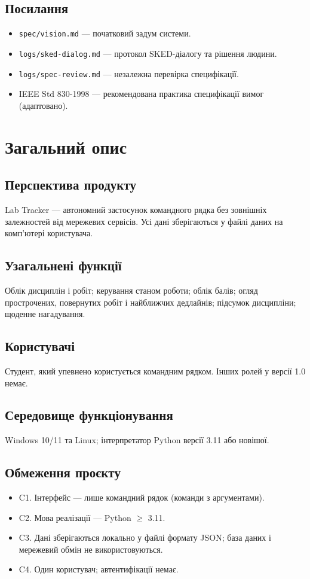 \documentclass[12pt,a4paper]{article}
\newcommand{\code}[1]{\texttt{#1}}
\begin{document}
\subsection{Посилання}
\begin{itemize}[nosep]
  \item \code{spec/vision.md} --- початковий задум системи.
  \item \code{logs/sked-dialog.md} --- протокол SKED-діалогу та рішення людини.
  \item \code{logs/spec-review.md} --- незалежна перевірка специфікації.
  \item IEEE Std 830-1998 --- рекомендована практика специфікації вимог (адаптовано).
\end{itemize}

\section{Загальний опис}

\subsection{Перспектива продукту}
Lab Tracker --- автономний застосунок командного рядка без зовнішніх залежностей від мережевих сервісів.
Усі дані зберігаються у файлі даних на комп'ютері користувача.

\subsection{Узагальнені функції}
Облік дисциплін і робіт; керування станом роботи; облік балів; огляд прострочених, повернутих робіт і найближчих дедлайнів; підсумок дисципліни; щоденне нагадування.

\subsection{Користувачі}
Студент, який упевнено користується командним рядком.
Інших ролей у версії 1.0 немає.

\subsection{Середовище функціонування}
Windows 10/11 та Linux; інтерпретатор Python версії 3.11 або новішої.

\subsection{Обмеження проєкту}
\begin{itemize}[nosep]
  \item C1. Інтерфейс --- лише командний рядок (команди з аргументами).
  \item C2. Мова реалізації --- Python $\ge$ 3.11.
  \item C3. Дані зберігаються локально у файлі формату JSON; база даних і мережевий обмін не використовуються.
  \item C4. Один користувач; автентифікації немає.
\end{itemize}
\end{document}
